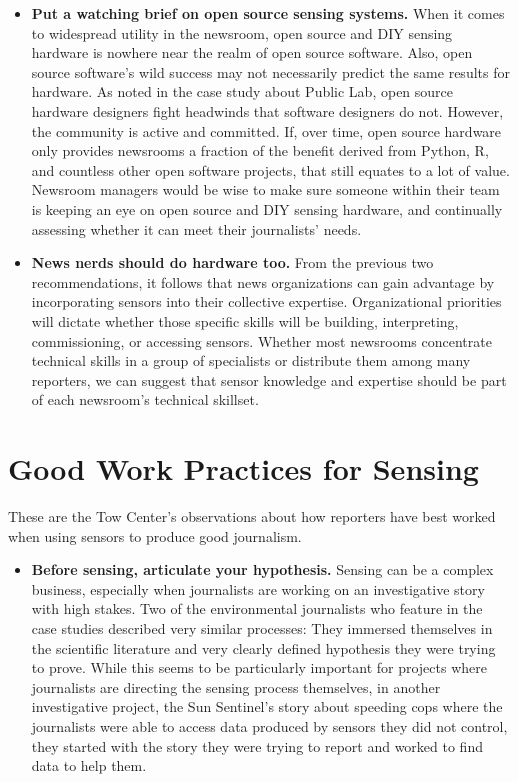 \begin{itemize}
\begin{itemized}
\begin{itemize}
\item \textbf{Put a watching brief on open source sensing systems.}
When it comes to widespread utility in the newsroom, open source and
DIY sensing hardware is nowhere near the realm of open source software.
Also, open source software's wild success may not necessarily predict the
same results for hardware. As noted in the case study about Public Lab,
open source hardware designers fight headwinds that software designers
do not. However, the community is active and committed. If, over time,
open source hardware only provides newsrooms a fraction of the benefit
derived from Python, R, and countless other open software projects, that
still equates to a lot of value. Newsroom managers would be wise to make
sure someone within their team is keeping an eye on open source and DIY
sensing hardware, and continually assessing whether it can meet their
journalists' needs.

\item \textbf{News nerds should do hardware too.}
From the previous two recommendations, it follows that news organizations
can gain advantage by incorporating sensors into their collective expertise.
Organizational priorities will dictate whether those specific skills will be building, interpreting, commissioning, or accessing sensors. Whether most
newsrooms concentrate technical skills in a group of specialists or distribute
them among many reporters, we can suggest that sensor knowledge and
expertise should be part of each newsroom's technical skillset.
\end{itemize}

\section{Good Work Practices for Sensing}
These are the Tow Center's observations about how reporters have best
worked when using sensors to produce good journalism.
\begin{itemize}
\item \textbf{Before sensing, articulate your hypothesis.}
Sensing can be a complex business, especially when journalists are working
on an investigative story with high stakes. Two of the environmental journalists
who feature in the case studies described very similar processes: They
immersed themselves in the scientific literature and very clearly defined
hypothesis they were trying to prove. While this seems to be particularly
important for projects where journalists are directing the sensing process
themselves, in another investigative project, the Sun Sentinel's story about
speeding cops where the journalists were able to access data produced by
sensors they did not control, they started with the story they were trying to
report and worked to find data to help them.


\end{itemize}
\end{itemized}
\end{itemize}
